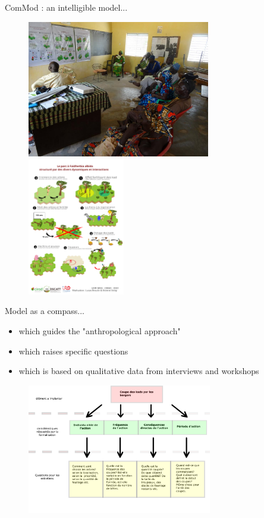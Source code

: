 \documentclass[aspectratio=169]{beamer}
\begin{document}
\begin{frame}{ComMod : an intelligible model...}
    \begin{center}
        \vspace{-1em}
        \begin{figure}
            \centering
            \includegraphics[height = 6cm]{img/atelierPoster.jpg}~
            \includegraphics[height = 6cm]{img/poster2.png}
        \end{figure}
    \end{center}
\end{frame}

\begin{frame}{Model as a compass...}
    \begin{itemize}
        \item which guides the "anthropological approach" 
        \item which raises specific questions 
        \item which is based on qualitative data from interviews and workshops  
    \end{itemize}
    \begin{center}
        \vspace{-1em}
        \begin{figure}
            \centering
            \includegraphics[height = 5.7cm]{img/questionImplementation.png}
        \end{figure}
    \end{center}
\end{frame}
\end{document}
